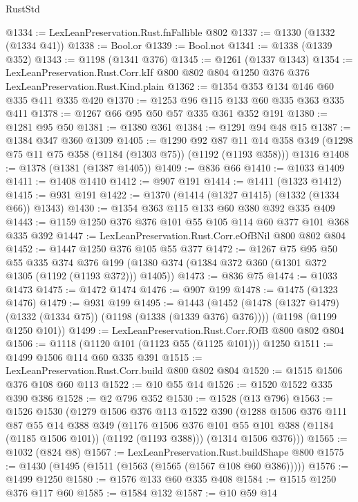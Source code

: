\begin{lexlean}{RustStd}
\begin{coremodule}
{\begin{coremodule}
{{{{{{{{{@1334 := LexLeanPreservation.Rust.fnFallible @802
@1337 := @1330 (@1332 (@1334 @41))
@1338 := Bool.or
@1339 := Bool.not
@1341 := @1338 (@1339 @352)
@1343 := @1198 (@1341 @376)
@1345 := @1261 (@1337 @1343)
@1354 := LexLeanPreservation.Rust.Corr.kIf
    @800
    @802
    @804
    @1250
    @376
    @376
    LexLeanPreservation.Rust.Kind.plain
@1362 := @1354 @353 @134 @146 @60 @335 @411 @335 @420
@1370 := @1253 @96 @115 @133 @60 @335 @363 @335 @411
@1378 := @1267 @66 @95 @50 @57 @335 @361 @352 @191
@1380 := @1281 @95 @50
@1381 := @1380 @361
@1384 := @1291 @94 @48 @15
@1387 := @1384 @347 @360 @1309
@1405 := @1290
    @92
    @87
    @11
    @14
    @358
    @349
    (@1298 @75 @11 @75 @358 (@1184 (@1303 @75)) (@1192 (@1193 @358)))
    @1316
@1408 := @1378 (@1381 (@1387 @1405))
@1409 := @836 @66
@1410 := @1033 @1409
@1411 := @1408 @1410
@1412 := @907 @191
@1414 := @1411 (@1323 @1412)
@1415 := @931 @191
@1422 := @1370 (@1414 (@1327 @1415) (@1332 (@1334 @66)) @1343)
@1430 := @1354 @363 @115 @133 @60 @380 @392 @335 @409
@1443 := @1159 @1250 @376 @376 @101 @55 @105 @114 @60 @377 @101 @368 @335 @392
@1447 := LexLeanPreservation.Rust.Corr.eOfBNil @800 @802 @804
@1452 := @1447 @1250 @376 @105 @55 @377
@1472 := @1267
    @75
    @95
    @50
    @55
    @335
    @374
    @376
    @199
    (@1380 @374 (@1384 @372 @360 (@1301 @372 @1305 (@1192 (@1193 @372))) @1405))
@1473 := @836 @75
@1474 := @1033 @1473
@1475 := @1472 @1474
@1476 := @907 @199
@1478 := @1475 (@1323 @1476)
@1479 := @931 @199
@1495 := @1443
    (@1452 (@1478 (@1327 @1479) (@1332 (@1334 @75)) (@1198 (@1338 (@1339 @376) @376))))
    (@1198 (@1199 @1250 @101))
@1499 := LexLeanPreservation.Rust.Corr.fOfB @800 @802 @804
@1506 := @1118 (@1120 @101 (@1123 @55 (@1125 @101))) @1250
@1511 := @1499 @1506 @114 @60 @335 @391
@1515 := LexLeanPreservation.Rust.Corr.build @800 @802 @804
@1520 := @1515 @1506 @376 @108 @60 @113
@1522 := @10 @55 @14
@1526 := @1520 @1522 @335 @390 @386
@1528 := @2 @796 @352
@1530 := @1528 (@13 @796)
@1563 := @1526
    @1530
    (@1279
      @1506
      @376
      @113
      @1522
      @390
      (@1288
        @1506
        @376
        @111
        @87
        @55
        @14
        @388
        @349
        (@1176 @1506 @376 @101 @55 @101 @388 (@1184 (@1185 @1506 @101)) (@1192 (@1193 @388)))
        (@1314 @1506 @376)))
@1565 := @1032 (@824 @8)
@1567 := LexLeanPreservation.Rust.buildShape @800
@1575 := @1430 (@1495 (@1511 (@1563 (@1565 (@1567 @108 @60 @386)))))
@1576 := @1499 @1250
@1580 := @1576 @133 @60 @335 @408
@1584 := @1515 @1250 @376 @117 @60
@1585 := @1584 @132
@1587 := @10 @59 @14
}}}}}}}}}
\end{coremodule}}
\end{coremodule}
\end{lexlean}
